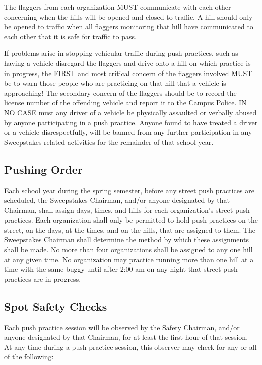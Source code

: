 	The flaggers from each organization MUST communicate with each other concerning
	when the hills will be opened and closed to traffic. A hill should only be
	opened to traffic when all flaggers monitoring that hill have communicated to
	each other that it is safe for traffic to pass.

	If problems arise in stopping vehicular traffic during push practices, such as
	having a vehicle disregard the flaggers and drive onto a hill on which practice
	is in progress, the FIRST and most critical concern of the flaggers involved
	MUST be to warn those people who are practicing on that hill that a vehicle is
	approaching! The secondary concern of the flaggers should be to record the
	license number of the offending vehicle and report it to the Campus Police. IN
	NO CASE must any driver of a vehicle be physically assaulted or verbally abused
	by anyone participating in a push practice. Anyone found to have treated a
	driver or a vehicle disrespectfully, will be banned from any further
	participation in any Sweepstakes related activities for the remainder of that
	school year.

\subsection{Pushing Order}

	Each school year during the spring semester, before any street push practices
	are scheduled, the Sweepstakes Chairman, and/or anyone designated by that
	Chairman, shall assign days, times, and hills for each organization's street
	push practices. Each organization shall only be permitted to hold push
	practices on the street, on the days, at the times, and on the hills, that are
	assigned to them. The Sweepstakes Chairman shall determine the method by which
	these assignments shall be made. No more than four organizations shall be
	assigned to any one hill at any given time. No organization may practice
	running more than one hill at a time with the same buggy until after 2:00 am on
	any night that street push practices are in progress.

\subsection{Spot Safety Checks}

	Each push practice session will be observed by the Safety Chairman, and/or
	anyone designated by that Chairman, for at least the first hour of that
	session. At any time during a push practice session, this observer may check
	for any or all of the following:

